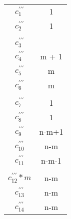 \documentclass{article}
\begin{document}
    \begin{minipage}{0.70\textwidth}
        
    \end{minipage}
    \hfill
    \begin{minipage}{0.25\textwidth}
        \begin{tabular}{|c|c}

            $c^{\prime\prime\prime}_1     $ & 1     \\
            $c^{\prime\prime\prime}_2     $ & 1     \\
            $                             $ &       \\
            $c^{\prime\prime\prime}_3     $ &       \\
            $c^{\prime\prime\prime}_4     $ & m + 1 \\
            $c^{\prime\prime\prime}_5     $ & m     \\
            $c^{\prime\prime\prime}_6     $ & m     \\
            $                             $ &       \\
            $c^{\prime\prime\prime}_7     $ & 1     \\
            $c^{\prime\prime\prime}_8     $ & 1     \\
            $c^{\prime\prime\prime}_9     $ & n-m+1 \\
            $c^{\prime\prime\prime}_{10}  $ & n-m   \\
            $c^{\prime\prime\prime}_{11}  $ & n-m-1 \\
            $                             $ &       \\
            $c^{\prime\prime\prime}_{12}*m$ & n-m   \\
            $c^{\prime\prime\prime}_{13}  $ & n-m   \\
            $c^{\prime\prime\prime}_{14}  $ & n-m   \\

        \end{tabular}
    \end{minipage}
\end{document}
